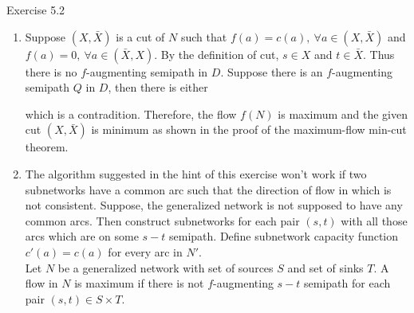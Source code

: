 \begin{remark}Exercise 5.2
	\begin{enumerate}
		\item Suppose $(X,\bar{X})$ is a cut of $N$ such that $f(a) = c(a),\ \forall a \in (X,\bar{X})$ and $f(a) = 0,\ \forall a \in (\bar{X},X)$.
		By the definition of cut, $s \in X$ and $t \in \bar{X}$.
	Thus there is no $f$-augmenting semipath in $D$.
Suppose there is an $f$-augmenting semipath $Q$ in $D$, then there is either  which is a contradition.
			Therefore, the flow $f(N)$ is maximum and the given cut $(X,\bar{X})$ is minimum as shown in the proof of the maximum-flow min-cut theorem.
		\setcounter{enumi}{2}
	\item The algorithm suggested in the hint of this exercise won't work if two subnetworks have a common arc such that the direction of flow in which is not consistent.
		Suppose, the generalized network is not supposed to have any common arcs.
			Then construct subnetworks for each pair $(s,t)$ with all those arcs which are on some $s-t$ semipath.
			Define subnetwork capacity function $c'(a) = c(a)$ for every arc in $N'$.\\

	Let $N$ be a generalized network with set of sources $S$ and set of sinks $T$.
			A flow in $N$ is maximum if there is not $f$-augmenting $s-t$ semipath for each pair $(s,t) \in S \times T$.
	\end{enumerate}
\end{remark}

